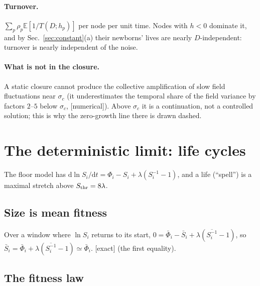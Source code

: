 \documentclass[11pt]{article}
\newcommand{\E}{\mathbb E}
\newcommand{\Sb}{\bar S}
\newcommand{\dd}{\mathrm d}
\newcommand{\exact}{\textsf{\small[exact]}}
\newcommand{\numer}{\textsf{\small[numerical]}}
\begin{document}
\paragraph{Turnover.}  $\sum_p\rho_p\E[1/T(D;h_p)]$ per node per unit time.  Nodes with $h<0$ dominate it, and by
Sec.~\ref{sec:constant}(a) their newborns' lives are nearly $D$-independent: turnover is nearly independent of the noise.

\paragraph{What is not in the closure.}  A static closure cannot produce the collective amplification of slow field
fluctuations near $\sigma_c$ (it underestimates the temporal share of the field variance by factors $2$--$5$ below $\sigma_c$,
\numer).  Above $\sigma_c$ it is a continuation, not a controlled solution; this is why the zero-growth line there is drawn
dashed.

\section{The deterministic limit: life cycles}
\label{sec:lifecycle}

The floor model has $\dd\ln S_i/\dd t=\Phi_i-S_i+\lambda(S_i^{-1}-1)$, and a life (``spell'') is a maximal stretch above
$S_{\rm thr}=8\lambda$.

\subsection{Size is mean fitness}

Over a window where $\ln S_i$ returns to its start, $0=\bar\Phi_i-\Sb_i+\lambda(\overline{S_i^{-1}}-1)$, so
$\Sb_i=\bar\Phi_i+\lambda(\overline{S_i^{-1}}-1)\simeq\bar\Phi_i$.  \exact{} (the first equality).

\subsection{The fitness law}
\end{document}

